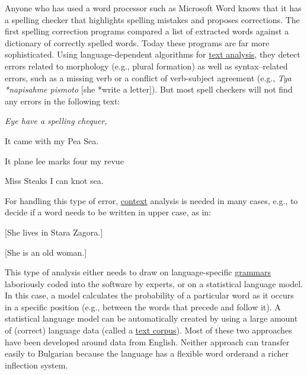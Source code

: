 \begin{multicols}{2}
Anyone who has used a word processor such as Microsoft Word knows that it has a spelling checker that highlights spelling mistakes and proposes corrections. The first spelling correction programs compared a list of extracted words against a dictionary of correctly spelled words. Today these programs are far more sophisticated. Using language-dependent algorithms for \uline{text analysis}, they detect errors related to morphology (e.g., plural formation) as well as syntax–related errors, such as a missing verb or a conflict of verb-subject agreement (e.g., \textit{Tya *napisahme pismoto} [she *write a letter]). But most spell checkers will not find any errors in the following text:  

{\it
\hspace{0.5cm}Eye have a spelling chequer,

\hspace{0.5cm}It came with my Pea Sea.

\hspace{0.5cm}It plane lee marks four my revue

\hspace{0.5cm}Miss Steaks I can knot sea. \cite{zar1}
}

For handling this type of error, \uline{context} analysis is needed in many cases, e.g., to decide if a word needs to be written in upper case, as in:

{\it
{}
}

\hspace{0.5cm}[She lives in Stara Zagora.]

{\it
{}
}

\hspace{0.5cm}[She is an old woman.]


This type of analysis either needs to draw on language-specific \uline{grammars} laboriously coded into the software by experts, or on a statistical language model. In this case, a model calculates the probability of a particular word as it occurs in a specific position (e.g., between the words that precede and follow it). A statistical language model can be automatically created by using a large amount of (correct) language data (called a \uline{text corpus}). Most of these two approaches have been developed around data from English. Neither approach can transfer easily to Bulgarian because the language has a flexible word orderand a richer inflection system. 


\end{multicols}
